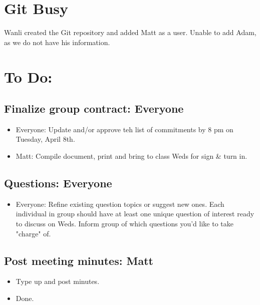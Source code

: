 \documentclass{article}
\begin{document}
\section{Git Busy}
Wanli created the Git repository and added Matt as a user.
Unable to add Adam, as we do not have his information.

\section{To Do:}
\subsection{Finalize group contract: Everyone}
\begin{itemize}
\item Everyone: Update and/or approve teh list of commitments by 8 pm on Tuesday, April 8th.
\item Matt: Compile document, print and bring to class Weds for sign \& turn in.
\end{itemize}

\subsection{Questions: Everyone}
\begin{itemize}
\item Everyone: Refine existing question topics or suggest new ones. Each individual in group should have at least one unique question of interest ready to discuss on Weds. Inform group of which questions you'd like to take "charge" of.
\end{itemize}

\subsection{Post meeting minutes: Matt}
\begin{itemize}
\item Type up and post minutes.
\item Done.
\end{itemize}
\end{document}
